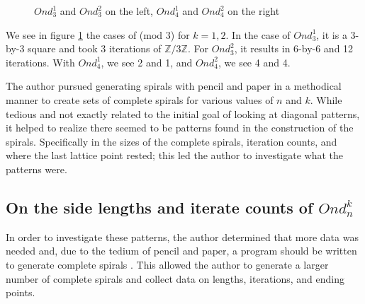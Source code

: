 \documentclass[11pt]{amsart}
\theoremstyle{mydef}
\begin{document}
\begin{figure}[h]
\centering
{}
\caption{$Ond^1_3$ and $Ond^2_3$ on the left, $Ond^1_4$ and $Ond^2_4$ on the right}
\label{fig:mod34}
\end{figure}

We see in figure \ref{fig:mod34} the cases of (mod 3) for $k=1,2$.  In the case of $Ond^1_3$, it is a 3-by-3 square and took 3 iterations of $\mathbb{Z}/3\mathbb{Z}$. For $Ond^2_3$, it results in 6-by-6 and 12 iterations. With $Ond^1_4$, we see 2 and 1, and $Ond^2_4$, we see 4 and 4.

The author pursued generating spirals with pencil and paper in a methodical manner to  create sets of complete spirals for various values of $n$ and $k$. While tedious and not exactly related to the initial goal of looking at diagonal patterns, it helped to realize there seemed to be patterns found in the construction of the spirals. Specifically in the sizes of the complete spirals, iteration counts, and where the last lattice point rested; this led the author to investigate what the patterns were.

\subsection{On the side lengths and iterate counts of $Ond^k_n$}
In order to investigate these patterns, the author determined that more data was needed and, due to the tedium of pencil and paper, a program should be written to generate complete spirals \cite{PySquare}. This allowed the author to generate a larger number of complete spirals and collect data on lengths, iterations, and ending points. 
\end{document}
